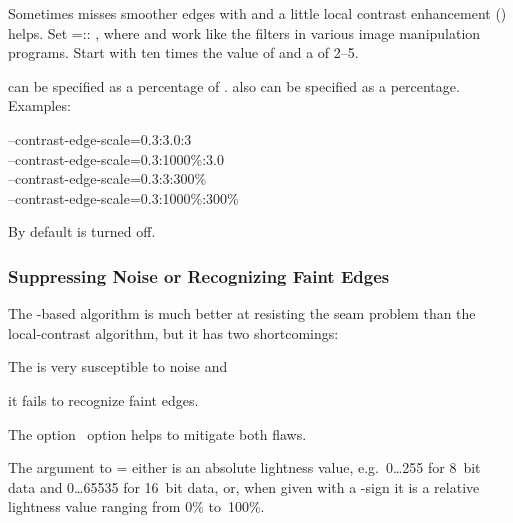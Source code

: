 Sometimes \App{} misses smoother edges with  and a little local
contrast enhancement () helps.  Set =\feasiblebreak {}:\feasiblebreak {}:\feasiblebreak
{}, where  and  work like
the  filters in various image manipulation
programs.  Start with  ten times the value of  and a
 of 2--5.

 can be specified as a percentage of .   also can be specified as a percentage.  Examples:

\begin{literal}
--contrast-edge-scale=0.3:3.0:3 \\
--contrast-edge-scale=0.3:1000\%:3.0 \\
--contrast-edge-scale=0.3:3:300\% \\
--contrast-edge-scale=0.3:1000\%:300\%
\end{literal}

By default  is turned off.


\subsubsection[Suppressing Noise or Recognizing Faint Edges]{%
  \label{sec:suppressing-noise-or-recognizing-faint-edges}%
  Suppressing Noise or Recognizing Faint Edges}

The -based algorithm is much better at resisting the seam problem than the
local-contrast algorithm, but it has two shortcomings:

\begin{compactenumerate}
\item
  The  is very susceptible to noise and

\item
  it fails to recognize faint edges.
\end{compactenumerate}

\noindent The option~ option helps to mitigate both flaws.

The argument to = either is an absolute
lightness value, e.g.\ 0\dots255 for 8~bit data and 0\dots65535 for 16~bit data, or, when given
with a \sample{\%}-sign it is a relative lightness value ranging from 0\% to~100\%.

